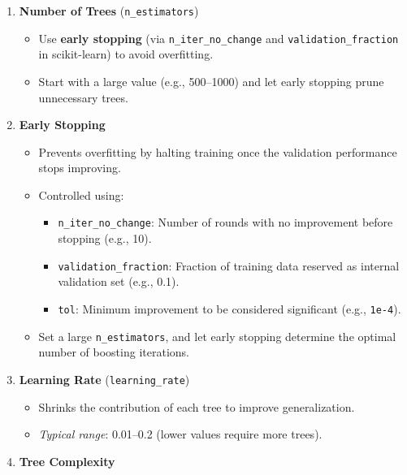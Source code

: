 \documentclass[
  letterpaper,
  DIV=11,
  numbers=noendperiod]{scrreprt}
\providecommand{\tightlist}{%
  \setlength{\itemsep}{0pt}\setlength{\parskip}{0pt}}\usepackage{longtable,booktabs,array}
\begin{document}
\begin{enumerate}
\def\labelenumi{\arabic{enumi}.}
\item
  \textbf{Number of Trees} (\texttt{n\_estimators})

  \begin{itemize}
  \tightlist
  \item
    Use \textbf{early stopping} (via \texttt{n\_iter\_no\_change} and
    \texttt{validation\_fraction} in scikit-learn) to avoid
    overfitting.\\
  \item
    Start with a large value (e.g., 500--1000) and let early stopping
    prune unnecessary trees.
  \end{itemize}
\item
  \textbf{Early Stopping}

  \begin{itemize}
  \tightlist
  \item
    Prevents overfitting by halting training once the validation
    performance stops improving.\\
  \item
    Controlled using:

    \begin{itemize}
    \tightlist
    \item
      \texttt{n\_iter\_no\_change}: Number of rounds with no improvement
      before stopping (e.g., 10).
    \item
      \texttt{validation\_fraction}: Fraction of training data reserved
      as internal validation set (e.g., 0.1).
    \item
      \texttt{tol}: Minimum improvement to be considered significant
      (e.g., \texttt{1e-4}).
    \end{itemize}
  \item
    Set a large \texttt{n\_estimators}, and let early stopping determine
    the optimal number of boosting iterations.
  \end{itemize}
\item
  \textbf{Learning Rate} (\texttt{learning\_rate})

  \begin{itemize}
  \tightlist
  \item
    Shrinks the contribution of each tree to improve generalization.\\
  \item
    \emph{Typical range}: 0.01--0.2 (lower values require more trees).
  \end{itemize}
\item
  \textbf{Tree Complexity}


\end{enumerate}
\end{document}
